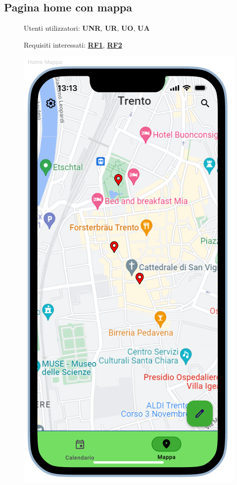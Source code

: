\documentclass{article}
\begin{document}
\subsection{Pagina home con mappa}
\begin{description}
    \item[] Utenti utilizzatori: \textbf{UNR}, \textbf{UR}, \textbf{UO}, \textbf{UA}
    \item[] Requisiti interessati: \hyperref[rf_1]{\textbf{RF1}}, \hyperref[rf_2]{\textbf{RF2}}
    \item[] \begin{center}
              \includegraphics[scale=0.6]{Home_Mappa.png}

\end{center}
\end{description}
\end{document}
